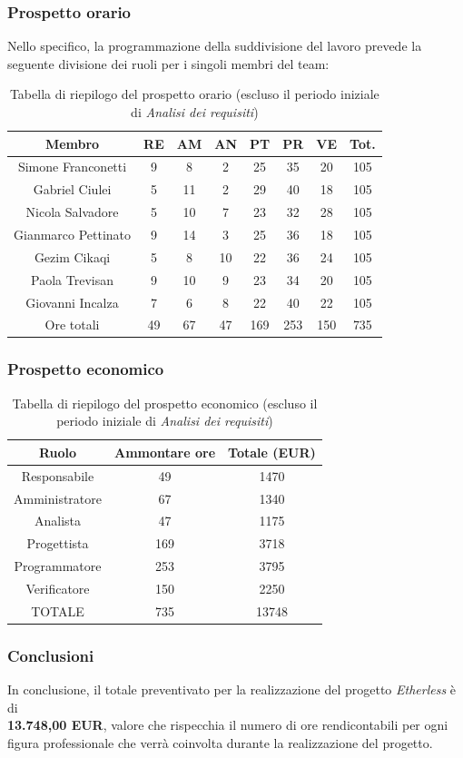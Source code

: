 \subsubsection{Prospetto orario}
Nello specifico, la programmazione della suddivisione del lavoro prevede la seguente divisione dei ruoli per i singoli membri del team:
\begin{table}[h]
	\caption{Tabella di riepilogo del prospetto orario (escluso il periodo iniziale di \textit{Analisi dei requisiti})} 
\begin{center}
\begin{tabular}{ |c|c|c|c|c|c|c|c|  }
 \hline
 Membro 		& RE 		& AM 		& AN 	& PT 	& PR 	& VE 	& Tot.\\
 \hline\hline
 Simone	Franconetti		& 9  	 	& 8			& 2 		& 25 		& 35 		& 20 		& 105\\
 Gabriel Ciulei		& 5 			& 11 		& 2 		& 29			& 40 		& 18 		& 105\\
 Nicola	Salvadore		& 5  		& 10 		& 7 		& 23 		& 32 		& 28 		& 105\\
 Gianmarco	Pettinato	& 9   		& 14 		& 3 		& 25		 	& 36 		& 18 		& 105\\
 Gezim	Cikaqi		& 5  		& 8  		& 10		& 22 		& 36 		& 24	 	& 105\\
 Paola	Trevisan		& 9  		& 10 		& 9 		& 23 		& 34 		& 20 		& 105\\
 Giovanni	Incalza	& 7  		& 6	 		& 8 		& 22 		& 40		 	& 22  		& 105\\
 \hline\hline
 Ore totali		& 49 	& 67		& 47 	& 169 	& 253 	& 150 	& 735\\
  \hline
\end{tabular}
\end{center}
\end{table}

\newpage
\subsubsection{Prospetto economico}
\begin{table}[h]
	\caption{Tabella di riepilogo del prospetto economico (escluso il periodo iniziale di \textit{Analisi dei requisiti})} 
	\begin{center}
		\begin{tabular}{ |c|c|c|  }
			\hline
			Ruolo 		& Ammontare ore 	& Totale (EUR)\\
			\hline
			\hline
			Responsabile	& 49 	& 1470\\
			Amministratore	& 67		& 1340\\
			Analista		& 47 	& 1175\\
			Progettista		& 169	& 3718\\
			Programmatore	& 253	& 3795\\
			Verificatore	& 150 	& 2250\\
			\hline\hline
			TOTALE		& 735		& 13748\\
			\hline
		\end{tabular}
	\end{center}
\end{table}

\subsubsection{Conclusioni}
In conclusione, il totale preventivato per la realizzazione del progetto \textit{Etherless} è di\\ \textbf{13.748,00 EUR}, valore che rispecchia il numero di ore rendicontabili per ogni figura professionale che verrà coinvolta durante la realizzazione del progetto. 
